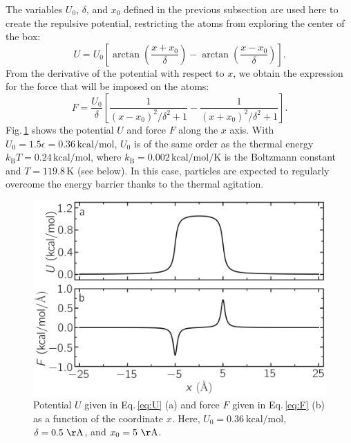 \documentclass[9pt,tutorial]{livecoms}
\begin{document}
The variables $U_0$, $\delta$, and $x_0$ defined in the previous subsection are
used here to create the repulsive potential, restricting the atoms from exploring
the center of the box:
\begin{equation}
U = U_0 \left[ \arctan \left( \dfrac{x+x_0}{\delta} \right)
- \arctan \left(\dfrac{x-x_0}{\delta} \right) \right].
\label{eq:U}
\end{equation}
From the derivative of the potential with respect to $x$, we obtain the expression
for the force that will be imposed on the atoms:
\begin{equation}
F= \dfrac{U_0}{\delta} \left[ \dfrac{1}{(x-x_0)^2/\delta^2+1}
- \dfrac{1}{(x+x_0)^2/\delta^2+1} \right].
\label{eq:F}
\end{equation}
Fig.\,\ref{fig:potential} shows the potential $U$ and force $F$ along the $x$ axis.
With $U_0 = 1.5 \epsilon = 0.36\,\text{kcal/mol}$, $U_0$ is of the same order as the
thermal energy $k_\text{B} T = 0.24\,\text{kcal/mol}$, where $k_\text{B} = 0.002\,\text{kcal/mol/K}$
is the Boltzmann constant and $T = 119.8\,\text{K}$ (see below). In this case,
particles are expected to regularly overcome the energy barrier thanks to
the thermal agitation.

\begin{figure}
\centering
\includegraphics[width=\linewidth]{US-potential}
\caption{Potential $U$ given in Eq.\,\eqref{eq:U} (a) and force $F$ given in
Eq.\,\eqref{eq:F} (b) as a function of the coordinate $x$. Here,
$U_0 = 0.36~\text{kcal/mol}$, $\delta = 0.5~\mathrm{\AA{}}$, and $x_0 = 5~\mathrm{\AA{}}$.}
\label{fig:potential}
\end{figure}
\end{document}
